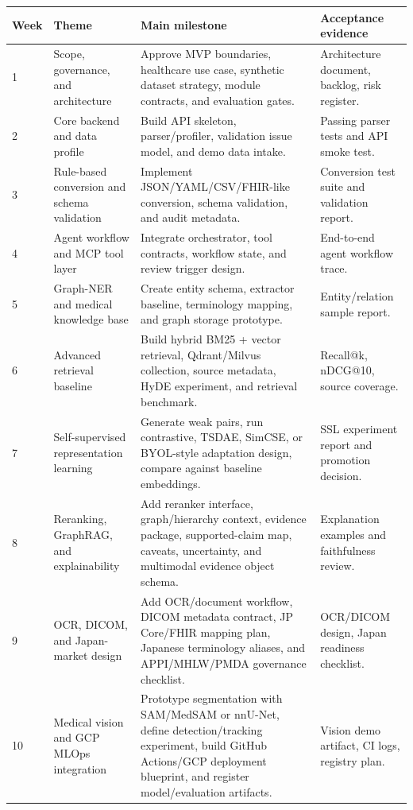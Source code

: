 \begin{longtable}{p{}p{}p{}p{}}
\toprule
\textbf{Week} & \textbf{Theme} & \textbf{Main milestone} & \textbf{Acceptance evidence} \\
\midrule
1 & Scope, governance, and architecture & Approve MVP boundaries, healthcare use case, synthetic dataset strategy, module contracts, and evaluation gates. & Architecture document, backlog, risk register. \\
2 & Core backend and data profile & Build API skeleton, parser/profiler, validation issue model, and demo data intake. & Passing parser tests and API smoke test. \\
3 & Rule-based conversion and schema validation & Implement JSON/YAML/CSV/FHIR-like conversion, schema validation, and audit metadata. & Conversion test suite and validation report. \\
4 & Agent workflow and MCP tool layer & Integrate orchestrator, tool contracts, workflow state, and review trigger design. & End-to-end agent workflow trace. \\
5 & Graph-NER and medical knowledge base & Create entity schema, extractor baseline, terminology mapping, and graph storage prototype. & Entity/relation sample report. \\
6 & Advanced retrieval baseline & Build hybrid BM25 + vector retrieval, Qdrant/Milvus collection, source metadata, HyDE experiment, and retrieval benchmark. & Recall@k, nDCG@10, source coverage. \\
7 & Self-supervised representation learning & Generate weak pairs, run contrastive, TSDAE, SimCSE, or BYOL-style adaptation design, compare against baseline embeddings. & SSL experiment report and promotion decision. \\
8 & Reranking, GraphRAG, and explainability & Add reranker interface, graph/hierarchy context, evidence package, supported-claim map, caveats, uncertainty, and multimodal evidence object schema. & Explanation examples and faithfulness review. \\
9 & OCR, DICOM, and Japan-market design & Add OCR/document workflow, DICOM metadata contract, JP Core/FHIR mapping plan, Japanese terminology aliases, and APPI/MHLW/PMDA governance checklist. & OCR/DICOM design, Japan readiness checklist. \\
10 & Medical vision and GCP MLOps integration & Prototype segmentation with SAM/MedSAM or nnU-Net, define detection/tracking experiment, build GitHub Actions/GCP deployment blueprint, and register model/evaluation artifacts. & Vision demo artifact, CI logs, registry plan. \\

\end{longtable}
